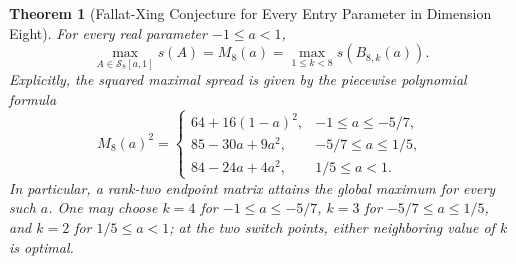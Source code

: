 \documentclass[11pt,reqno]{article}
\newtheorem{theorem}{Theorem}[section]
\theoremstyle{definition}
\begin{document}
\begin{theorem}[Fallat-Xing Conjecture for Every Entry Parameter in Dimension Eight]\label{thm:complete-n8}
For every real parameter $-1\le a<1$,
\begin{equation}\label{eq:n8-complete}
\max_{A\in\mathcal S_8[a,1]}s(A)=M_8(a)=\max_{1\le k<8}s(B_{8,k}(a)).
\end{equation}
Explicitly, the squared maximal spread is given by the piecewise polynomial formula
\begin{equation}\label{eq:n8-piecewise}
M_8(a)^2 = 
\begin{cases}
64 + 16(1-a)^2, & -1 \le a \le -5/7, \\
85 - 30a + 9a^2, & -5/7 \le a \le 1/5, \\
84 - 24a + 4a^2, & 1/5 \le a < 1.
\end{cases}
\end{equation}
In particular, a rank-two endpoint matrix attains the global maximum for every such $a$. One may choose $k=4$ for $-1\le a\le-5/7$, $k=3$ for $-5/7\le a\le1/5$, and $k=2$ for $1/5\le a<1$; at the two switch points, either neighboring value of $k$ is optimal.
\end{theorem}
\end{document}
